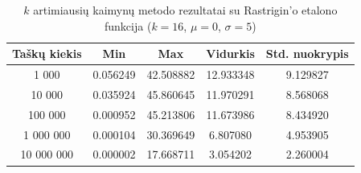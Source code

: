 \begin{table}[H]
    \centering
    \begin{tabular}{|c|c|c|c|c|}
        \hline
        \textbf{Taškų kiekis} & \textbf{Min} & \textbf{Max} & \textbf{Vidurkis} & \textbf{Std. nuokrypis} \\ \hline
        1 000        & 0.056249 & 42.508882 & 12.933348 & 9.129827 \\ \hline
        10 000       & 0.035924 & 45.860645 & 11.970291 & 8.568068 \\ \hline
        100 000      & 0.000952 & 45.213806 & 11.673986 & 8.434920 \\ \hline
        1 000 000    & 0.000104 & 30.369649 & 6.807080 & 4.953905 \\ \hline
        10 000 000   & 0.000002 & 17.668711 & 3.054202 & 2.260004 \\ \hline
    \end{tabular}
    \caption{$k$ artimiausių kaimynų metodo rezultatai su Rastrigin'o etalono funkcija ($k = 16$, $\mu = 0$, $\sigma = 5$)}
\end{table}